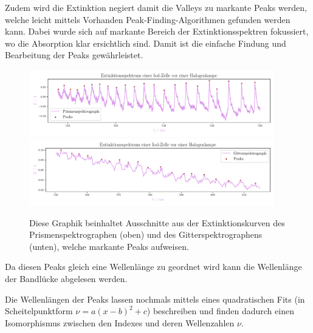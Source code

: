 \documentclass[12pt,english,ngerman]{scrartcl}
\begin{document}
Zudem wird die Extinktion negiert damit die Valleys zu markante Peaks werden,
welche leicht mittels Vorhanden Peak-Finding-Algorithmen gefunden werden kann.
Dabei wurde sich auf markante Bereich der Extinktionsspektren fokussiert, wo
die Absorption klar ersichtlich sind. Damit ist die einfache Findung und
Bearbeitung der Peaks gewährleistet.

\begin{figure}[H]
	\begin{center}
		\includegraphics[width=0.95\textwidth]{figures/prism_ausschnitt_extinction.pdf}
		\includegraphics[width=0.95\textwidth]{figures/gitter_ausschnitt_extinction.pdf}
	\end{center}
	\caption{Diese Graphik beinhaltet Ausschnitte aus der Extinktionskurven
		des Prismenspektrographen (oben) und des Gitterspektrographens 
		(unten), welche markante Peaks aufweisen.
	}\label{fig:ausschnittPeaks}
\end{figure}

Da diesen Peaks gleich eine Wellenlänge zu geordnet wird kann die Wellenlänge
der Bandlücke abgelesen werden.

Die Wellenlängen der Peaks lassen nochmals mittels eines quadratischen Fits (in
Scheitelpunktform $\nu = a (x-b)^2 + c$) beschreiben und finden dadurch einen
Isomorphismus zwischen den Indexes und deren Wellenzahlen $\nu$.
\end{document}
